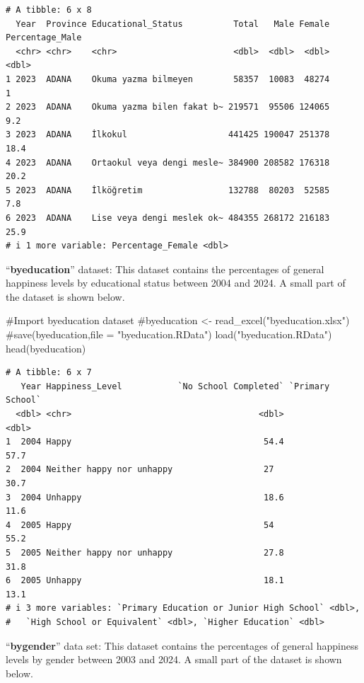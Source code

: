 \documentclass[
  11pt,
  a4paper,
  DIV=11,
  numbers=noendperiod]{scrartcl}
\newenvironment{Shaded}{\begin{snugshade}}{\end{snugshade}}
\newcommand{\CommentTok}[1]{\textcolor[rgb]{0.37,0.37,0.37}{#1}}
\newcommand{\FunctionTok}[1]{\textcolor[rgb]{0.28,0.35,0.67}{#1}}
\newcommand{\NormalTok}[1]{\textcolor[rgb]{0.00,0.23,0.31}{#1}}
\newcommand{\StringTok}[1]{\textcolor[rgb]{0.13,0.47,0.30}{#1}}
\begin{document}
\begin{verbatim}
# A tibble: 6 x 8
  Year  Province Educational_Status          Total   Male Female Percentage_Male
  <chr> <chr>    <chr>                       <dbl>  <dbl>  <dbl>           <dbl>
1 2023  ADANA    Okuma yazma bilmeyen        58357  10083  48274             1  
2 2023  ADANA    Okuma yazma bilen fakat b~ 219571  95506 124065             9.2
3 2023  ADANA    İlkokul                    441425 190047 251378            18.4
4 2023  ADANA    Ortaokul veya dengi mesle~ 384900 208582 176318            20.2
5 2023  ADANA    İlköğretim                 132788  80203  52585             7.8
6 2023  ADANA    Lise veya dengi meslek ok~ 484355 268172 216183            25.9
# i 1 more variable: Percentage_Female <dbl>
\end{verbatim}

{``\textbf{byeducation}}'' dataset: This dataset contains the
percentages of general happiness levels by educational status between
2004 and 2024. A small part of the dataset is shown below.

\begin{Shaded}
\begin{Highlighting}[]
\CommentTok{\#Import byeducation dataset}
\CommentTok{\#byeducation \textless{}{-} read\_excel("byeducation.xlsx")}
\CommentTok{\#save(byeducation,file = "byeducation.RData")}
\FunctionTok{load}\NormalTok{(}\StringTok{"byeducation.RData"}\NormalTok{)}
\FunctionTok{head}\NormalTok{(byeducation)}
\end{Highlighting}
\end{Shaded}

\begin{verbatim}
# A tibble: 6 x 7
   Year Happiness_Level           `No School Completed` `Primary  School`
  <dbl> <chr>                                     <dbl>             <dbl>
1  2004 Happy                                      54.4              57.7
2  2004 Neither happy nor unhappy                  27                30.7
3  2004 Unhappy                                    18.6              11.6
4  2005 Happy                                      54                55.2
5  2005 Neither happy nor unhappy                  27.8              31.8
6  2005 Unhappy                                    18.1              13.1
# i 3 more variables: `Primary Education or Junior High School` <dbl>,
#   `High School or Equivalent` <dbl>, `Higher Education` <dbl>
\end{verbatim}

{``\textbf{bygender}''} data set: This dataset contains the percentages
of general happiness levels by gender between 2003 and 2024. A small
part of the dataset is shown below.
\end{document}
